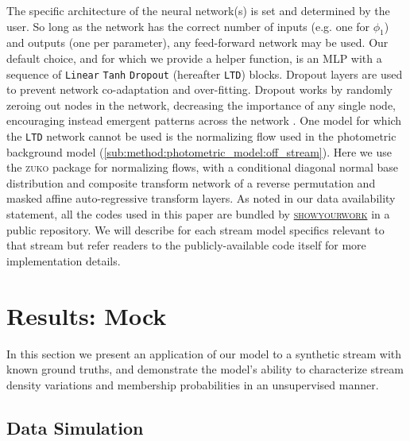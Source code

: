 \documentclass[twocolumn]{aastex631}
\newcommand{\code}[1]{\textsc{#1}}
\newcommand{\package}[1]{\code{#1}}
\begin{document}
        The specific architecture of the neural network(s) is set and determined
        by the user. So long as the network has the correct number of inputs
        (e.g. one for $\phi_1$) and outputs (one per parameter), any
        feed-forward network may be used.  Our default choice, and for which we
        provide a helper function, is an MLP with a sequence of \texttt{Linear}
        \!\!\textrightarrow \texttt{Tanh} \!\!\textrightarrow \texttt{Dropout}
        (hereafter \texttt{LTD}) blocks.  Dropout layers are used to prevent
        network co-adaptation and over-fitting. Dropout works by randomly
        zeroing out nodes in the network, decreasing the importance of any
        single node, encouraging instead emergent patterns across the network
        \citep{GalGhahramani2015}.  One model for which the \texttt{LTD} network
        cannot be used is the normalizing flow used in the photometric
        background model (\autoref{sub:method:photometric_model:off_stream}).
        Here we use the \package{zuko} package for normalizing flows, with a
        conditional diagonal normal base distribution and composite transform
        network of a reverse permutation and masked affine auto-regressive
        transform layers. As noted in our data availability statement, all the
        codes used in this paper are bundled by
        \href{https://github.com/showyourwork/showyourwork}{\package{showyourwork}}
        \citep{Luger+2021} in a public repository. We will describe for each
        stream model specifics relevant to that stream but refer readers to the
        publicly-available code itself for more implementation details.
        

\section{Results: Mock} \label{sec:results_mock}

    In this section we present an application of our model to a synthetic stream
    with known ground truths, and demonstrate the model's ability to
    characterize stream density variations and membership probabilities in an
    unsupervised manner.

    \subsection{Data Simulation} \label{sub:results_mock:data}
\end{document}
